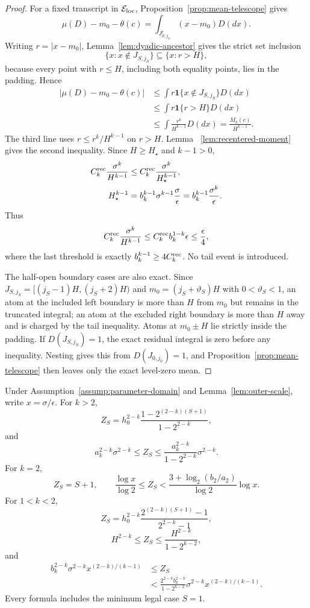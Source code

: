 \begin{proof}
For a fixed transcript in $\mathcal E_{\rm loc}$,
Proposition~\ref{prop:mean-telescope} gives
\[
 \mu(D)-m_0-\theta(c)=\int_{J_{S,j_S}^c}(x-m_0)D(dx).
\]
Writing $r=|x-m_0|$, Lemma~\ref{lem:dyadic-ancestor} gives the strict set
inclusion
\[
 \{x:x\notin J_{S,j_S}\}\subseteq\{x:r>H\},
\]
because every point with $r\leq H$, including both equality points, lies in
the padding.  Hence
\[
\begin{aligned}
 |\mu(D)-m_0-\theta(c)|
 &\leq\int r\mathbf1\{x\notin J_{S,j_S}\}D(dx)\\
 &\leq\int r\mathbf1\{r>H\}D(dx)\\
 &\leq\int\frac{r^k}{H^{k-1}}D(dx)
 =\frac{M_k(c)}{H^{k-1}}.
\end{aligned}
\]
The third line uses $r\leq r^k/H^{k-1}$ on $r>H$.  Lemma~
\ref{lem:recentered-moment} gives the second inequality.  Since
$H\geq H_\star$ and $k-1>0$,
\[
\begin{aligned}
 C_k^{\rm rec}\frac{\sigma^k}{H^{k-1}}
 &\leq C_k^{\rm rec}\frac{\sigma^k}{H_\star^{k-1}},\\
 H_\star^{k-1}
 &=b_k^{k-1}\sigma^{k-1}\frac\sigma\epsilon
 =b_k^{k-1}\frac{\sigma^k}{\epsilon}.
\end{aligned}
\]
Thus
\[
 C_k^{\rm rec}\frac{\sigma^k}{H^{k-1}}
 \leq C_k^{\rm rec}b_k^{1-k}\epsilon\leq\frac\epsilon4,
\]
where the last threshold is exactly $b_k^{k-1}\geq4C_k^{\rm rec}$.
No tail event is introduced.

The half-open boundary cases are also exact.  Since
$J_{S,j_S}=[(j_S-1)H,(j_S+2)H)$ and
$m_0=(j_S+\vartheta_S)H$ with $0<\vartheta_S<1$, an atom at the included
left boundary is more than $H$ from $m_0$ but remains in the truncated
integral; an atom at the excluded right boundary is more than $H$ away and
is charged by the tail inequality.  Atoms at $m_0\pm H$ lie strictly inside
the padding.  If $D(J_{S,j_S})=1$, the exact residual integral is zero before
any inequality.  Nesting gives this from $D(J_{0,j_0})=1$, and
Proposition~\ref{prop:mean-telescope} then leaves only the exact level-zero
mean.
\end{proof}

\begin{lemma}
\label{lem:normalizer}
Under Assumption~\ref{assump:parameter-domain} and
Lemma~\ref{lem:outer-scale}, write $x=\sigma/\epsilon$.  For $k>2$,
\[
 Z_S=h_0^{2-k}\frac{1-2^{(2-k)(S+1)}}{1-2^{2-k}},
\]
and
\[
 a_k^{2-k}\sigma^{2-k}\leq Z_S
 \leq\frac{a_k^{2-k}}{1-2^{2-k}}\sigma^{2-k}.
\]
For $k=2$,
\[
 Z_S=S+1,
 \qquad
 \frac{\log x}{\log2}\leq Z_S
 <\frac{3+\log_2(b_2/a_2)}{\log2}\log x.
\]
For $1<k<2$,
\[
 Z_S=h_0^{2-k}\frac{2^{(2-k)(S+1)}-1}{2^{2-k}-1},
\]
\[
 H^{2-k}\leq Z_S\leq\frac{H^{2-k}}{1-2^{k-2}},
\]
and
\[
\begin{aligned}
 b_k^{2-k}\sigma^{2-k}x^{(2-k)/(k-1)}
 &\leq Z_S\\
 &<\frac{2^{2-k}b_k^{2-k}}{1-2^{k-2}}
 \sigma^{2-k}x^{(2-k)/(k-1)}.
\end{aligned}
\]
Every formula includes the minimum legal case $S=1$.
\end{lemma}

